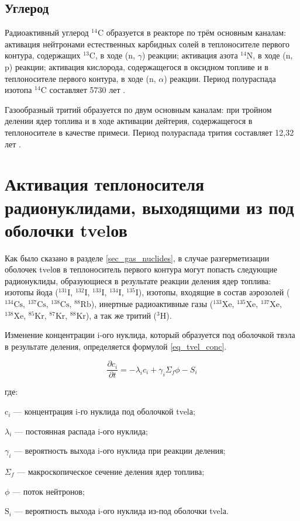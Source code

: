 \subsection{Углерод}

Радиоактивный углерод $^{14}\text{C}$ образуется в реакторе по трём основным каналам: активация нейтронами естественных 
карбидных солей в теплоносителе первого контура, содержащих $^{13}\text{C}$, в ходе (n, $\gamma$) реакции; активация 
азота $^{14}\text{N}$, в ходе (n, p) реакции; активация кислорода, содержащегося в оксидном топливе и в теплоносителе 
первого контура, в ходе (n, $\alpha$) реакции. Период полураспада изотопа $^{14}\text{C}$ составляет 5730 лет 
\cite{bekman_nuclear}.

Газообразный тритий образуется по двум основным каналам: при тройном делении ядер топлива и в ходе активации дейтерия, 
содержащегося в теплоносителе в качестве примеси. Период полураспада трития составляет 12,32 лет \cite{bekman_nuclear}.

\section{Активация теплоносителя радионуклидами, выходящими из под оболочки \ac{tvel}ов}
\label{sec_tvel_nuclides}

Как было сказано в разделе \ref{sec_gas_nuclides}, в случае разгерметизации оболочек \ac{tvel}ов в теплоноситель 
первого контура могут попасть следующие радионуклиды, образующиеся в результате реакции деления ядер топлива: изотопы 
йода ($^{131}\text{I}$, $^{132}\text{I}$, $^{133}\text{I}$, $^{134}\text{I}$, $^{135}\text{I}$), изотопы, входящие в 
состав аэрозолей ($^{134}\text{Cs}$, $^{137}\text{Cs}$, $^{138}\text{Cs}$, $^{88}\text{Rb}$), инертные радиоактивные 
газы ($^{133}\text{Xe}$, $^{135}\text{Xe}$, $^{137}\text{Xe}$, $^{138}\text{Xe}$, $^{85}\text{Kr}$, $^{87}\text{Kr}$, 
$^{88}\text{Kr}$), а так же тритий ($^{3}\text{H}$).

Изменение концентрации i-ого нуклида, который образуется под оболочкой твэла в результате деления, определяется формулой 
\ref{eq_tvel_conc}.

\begin{equation}
    \label{eq_tvel_conc}
    \frac{\partial c_{i}}{\partial t} = -\lambda_{i}c_{i} + \gamma_{i}\Sigma_{f}\phi - S_{i}
\end{equation}

где:
\begin{description}
    \item $\text{c}_i$ --- концентрация i-го нуклида под оболочкой \ac{tvel}а;
    \item $\lambda_{i}$ ---  постоянная распада i-ого нуклида;
    \item $\gamma_{i}$ --- вероятность выхода i-ого нуклида при реакции деления;
    \item $\Sigma_{f}$ --- макроскопическое сечение деления ядер топлива;
    \item $\phi$ --- поток нейтронов;
    \item $\text{S}_{i}$ --- вероятность выхода i-ого нуклида из-под оболочки \ac{tvel}а.
\end{description}

